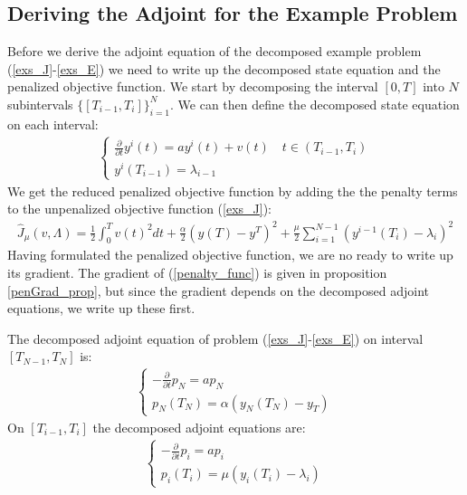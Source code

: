 \subsection{Deriving the Adjoint for the Example Problem}
Before we derive the adjoint equation of the decomposed example problem (\ref{exs_J}-\ref{exs_E}) we need to write up the decomposed state equation and the penalized objective function. We start by decomposing the interval $[0,T]$ into $N$ subintervals $\{[T_{i-1},T_{i}]\}_{i=1}^{N}$. We can then define the decomposed state equation on each interval:
\begin{align}
\left\{
     \begin{array}{lr}
       	\frac{\partial}{\partial t} y^i(t)=a y^i(t) + v(t) \quad t\in(T_{i-1},T_{i})\\
       	y^i(T_{i-1})=\lambda_{i-1}
     \end{array}
   \right. \label{decomp_E}
\end{align}
We get the reduced penalized objective function by adding the the penalty terms to the unpenalized objective function (\ref{exs_J}):
\begin{align}
\hat J_{\mu}(v,\Lambda) = \frac{1}{2}\int_0^Tv(t)^2dt + \frac{\alpha}{2}(y(T)-y^T)^2 + \frac{\mu}{2}\sum_{i=1}^{N-1}(y^{i-1}(T_i)-\lambda_i)^2 \label{penalty_func}
\end{align}
Having formulated the penalized objective function, we are no ready to write up its gradient. The gradient of (\ref{penalty_func}) is given in proposition \ref{penGrad_prop}, but since the gradient depends on the decomposed adjoint equations, we write up these first.
\begin{proposition} \label{pen_adjoint_prop}
The decomposed adjoint equation of problem (\ref{exs_J}-\ref{exs_E}) on interval $[T_{N-1},T_N]$ is:
\begin{align}
\left\{
     \begin{array}{lr}
	-\frac{\partial }{\partial t}p_N =a p_N  \\
	p_N(T_{N}) = \alpha( y_N(T_{N})-y_T)
	\end{array}
   \right. \label{end adjoint}
\end{align}
On $[T_{i-1},T_i]$ the decomposed adjoint equations are:
\begin{align}
\left\{
     \begin{array}{lr}
	-\frac{\partial }{\partial t}p_i =ap_i  \\
	p_i(T_{i}) = \mu(y_{i}(T_{i})-\lambda_{i} )
	\end{array}
   \right. \label{exs_adjoint}
\end{align}
\end{proposition} 
